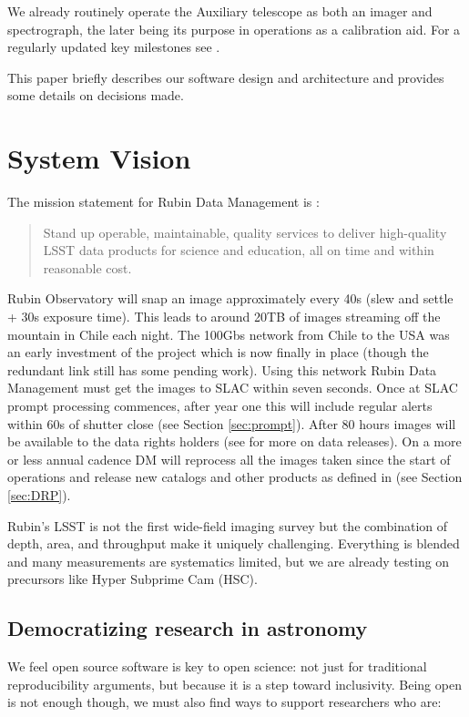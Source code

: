 \documentclass[11pt,twoside]{article}
\begin{document}
We already routinely operate the Auxiliary telescope as both an imager and spectrograph, the later being its purpose in operations as a calibration aid. For a regularly updated key milestones see \citep{DMTN-232}.

This paper briefly describes our software design and architecture and provides some details on decisions made.

\section{System Vision}
The mission statement for Rubin Data Management is :
\begin{quote}
Stand up operable, maintainable, quality services to deliver high-quality LSST data products for science and education, all on time and within reasonable cost.

\end{quote}

Rubin Observatory will snap an image approximately every 40s (slew and settle + 30s exposure time).
This leads to around 20TB of images streaming off the mountain in Chile each night.
The 100Gbs network from Chile to the USA was an early investment of the project which is now finally in place (though the redundant link still has some pending work).
Using this network Rubin Data Management must get the images to SLAC within seven seconds.
Once at SLAC prompt processing commences, after year one this will include regular alerts within 60s of shutter close (see Section \ref{sec:prompt}).
After 80 hours images will be available to the data rights holders (see \citep{RDO-011} for more on data releases).
On a more or less annual cadence DM will reprocess all the images taken since the start of operations and release new catalogs and other products as defined in \citet{LSE-163} (see Section \ref{sec:DRP}).

Rubin’s LSST is not the first wide-field imaging survey but the combination of depth, area, and throughput make it uniquely challenging.
Everything is blended and many measurements are systematics limited, but
we are already testing  on precursors like Hyper Subprime Cam (HSC).


\subsection{Democratizing research in astronomy}

We feel open source software is key to open science: not just for traditional reproducibility arguments, but because it is a step toward inclusivity.
Being open is not enough though, we must also find ways to support researchers who are:
\end{document}
